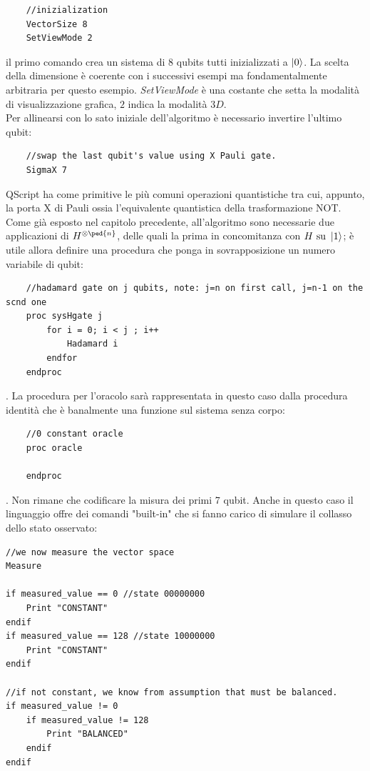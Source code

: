 \documentclass[12pt,a4paper,openright]{report}
\begin{document}
\begin{lstlisting}
    //inizialization
    VectorSize 8
    SetViewMode 2
\end{lstlisting}

il primo comando crea un sistema di 8 qubits tutti inizializzati a $\ket0$. La scelta della dimensione è coerente con i successivi esempi ma fondamentalmente arbitraria per questo esempio.
\textit{SetViewMode} è una costante che setta la modalità di visualizzazione grafica, $2$ indica la modalità $3D$.\\  
Per allinearsi con lo sato iniziale dell'algoritmo è necessario invertire l'ultimo qubit:

\begin{lstlisting}
    //swap the last qubit's value using X Pauli gate.
    SigmaX 7
\end{lstlisting}

QScript ha come primitive le più comuni operazioni quantistiche tra cui, appunto, la porta X di Pauli ossia l'equivalente quantistica della trasformazione NOT.\\
Come già esposto nel capitolo precedente, all'algoritmo sono necessarie due applicazioni di $H^{\otimes\ped{n}}$, delle quali la prima in concomitanza con $H \text{ su } \ket{1}$;
è utile allora definire una procedura che ponga in sovrapposizione un numero variabile di qubit:

\begin{lstlisting}
    //hadamard gate on j qubits, note: j=n on first call, j=n-1 on the scnd one
    proc sysHgate j
        for i = 0; i < j ; i++
            Hadamard i
        endfor
    endproc
\end{lstlisting}

\newpage
. La procedura per l'oracolo sarà rappresentata in questo caso dalla procedura identità che è banalmente una funzione sul sistema senza corpo:

\begin{lstlisting}
    //0 constant oracle
    proc oracle

    endproc
\end{lstlisting}

. Non rimane che codificare la misura dei primi 7 qubit. Anche in questo caso il linguaggio offre dei comandi "built-in" che si fanno carico di simulare il collasso dello stato osservato:

\begin{lstlisting}
//we now measure the vector space
Measure

if measured_value == 0 //state 00000000 
	Print "CONSTANT"
endif
if measured_value == 128 //state 10000000
	Print "CONSTANT"
endif

//if not constant, we know from assumption that must be balanced.
if measured_value != 0
	if measured_value != 128
		Print "BALANCED"
	endif
endif
\end{lstlisting}
\end{document}
